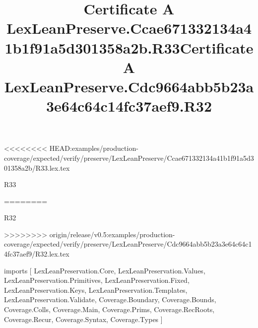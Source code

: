 <<<<<<<< HEAD:examples/production-coverage/expected/verify/preserve/LexLeanPreserve/Ccae671332134a41b1f91a5d301358a2b/R33.lex.tex
\begin{lexlean}{R33}
\title{Certificate A LexLeanPreserve.Ccae671332134a41b1f91a5d301358a2b.R33}
========
\begin{lexlean}{R32}
\title{Certificate A LexLeanPreserve.Cdc9664abb5b23a3e64c64c14fc37aef9.R32}
>>>>>>>> origin/release/v0.5:examples/production-coverage/expected/verify/preserve/LexLeanPreserve/Cdc9664abb5b23a3e64c64c14fc37aef9/R32.lex.tex
\begin{coremodule}
imports [
  LexLeanPreservation.Core,
  LexLeanPreservation.Values,
  LexLeanPreservation.Primitives,
  LexLeanPreservation.Fixed,
  LexLeanPreservation.Keys,
  LexLeanPreservation.Templates,
  LexLeanPreservation.Validate,
  Coverage.Boundary,
  Coverage.Bounds,
  Coverage.Colls,
  Coverage.Main,
  Coverage.Prims,
  Coverage.RecRoots,
  Coverage.Recur,
  Coverage.Syntax,
  Coverage.Types
]


\end{coremodule}
\end{lexlean}
\end{lexlean}
